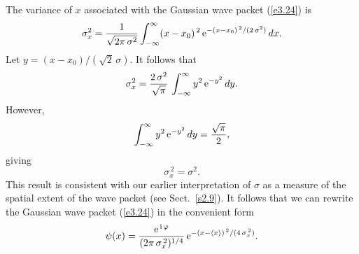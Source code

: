 The variance of $x$ associated with the Gaussian wave packet (\ref{e3.24})
is
\begin{equation}
\sigma^2_x = \frac{1}{\sqrt{2\pi\,\sigma^2}}\int_{-\infty}^{\infty}
(x-x_0)^{\,2}\,{\rm e}^{-(x-x_0)^{\,2}/(2\,\sigma^2)}\,dx.
\end{equation}
Let $y=(x-x_0)/(\sqrt{2}\,\sigma)$. It follows that
\begin{equation}
\sigma^2_x =\frac{2\,\sigma^2}{\sqrt{\pi}}\,\int_{-\infty}^{\infty} y^2\,{\rm e}^{-y^2}\,dy.
\end{equation}
However,
\begin{equation}
\int_{-\infty}^{\infty} y^2\,{\rm e}^{-y^2}\,dy = \frac{\sqrt{\pi}}{2},
\end{equation}
giving
\begin{equation}
\sigma_x^{\,2} = \sigma^2.
\end{equation}
This result is consistent with our earlier interpretation of $\sigma$ as a measure of the
spatial extent of the wave packet (see Sect.~\ref{s2.9}).
It follows that we can rewrite the Gaussian wave packet (\ref{e3.24}) in the convenient form
\begin{equation}
\psi(x) = \frac{{\rm e}^{\,{\rm i}\,\varphi}}{(2\pi\,\sigma_x^{\,2})^{1/4}}\,{\rm e}^{-(x-\langle x\rangle)^{\,2}/(4\,\sigma_x^{\,2})}.
\end{equation}

